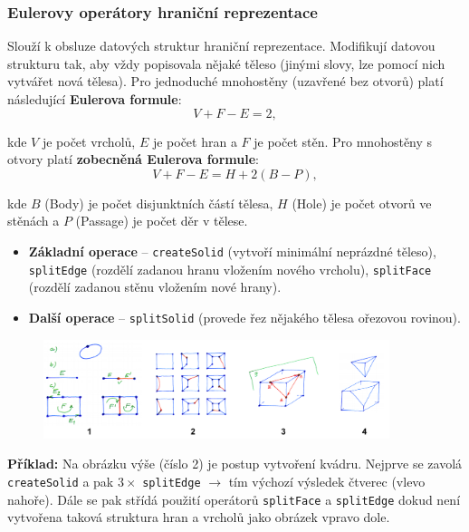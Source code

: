 \subsubsection{Eulerovy operátory hraniční reprezentace}
Slouží k obsluze datových struktur hraniční reprezentace. Modifikují datovou strukturu tak, aby vždy popisovala nějaké těleso (jinými slovy, lze pomocí nich vytvářet nová tělesa). Pro jednoduché mnohostěny (uzavřené bez otvorů) platí následující \textbf{Eulerova formule}:
\begin{equation*}
V + F - E = 2,
\end{equation*}

kde $ V $ je počet vrcholů, $ E $ je počet hran a $ F $ je počet stěn. Pro mnohostěny s otvory platí \textbf{zobecněná Eulerova formule}:
\begin{equation*}
V + F - E = H + 2(B - P),
\end{equation*}

kde $ B $ (Body) je počet disjunktních částí tělesa, $ H $ (Hole) je počet otvorů ve stěnách a $ P $ (Passage) je počet děr v tělese.

\begin{itemize}
	\item \textbf{Základní operace} -- \texttt{createSolid} (vytvoří minimální neprázdné těleso), \texttt{splitEdge} (rozdělí zadanou hranu vložením nového vrcholu), \texttt{splitFace} (rozdělí zadanou stěnu vložením nové hrany).
	\item \textbf{Další operace} -- \texttt{splitSolid} (provede řez nějakého tělesa ořezovou rovinou).
\end{itemize}

\begin{figure}[H]
	\centering
	\includegraphics[width=0.9\textwidth]{assets/4_hranicni_euler}
\end{figure} 

\textbf{Příklad:} Na obrázku výše (číslo 2) je postup vytvoření kvádru. Nejprve se zavolá \texttt{createSolid} a pak $3 \times$ \texttt{splitEdge} $\rightarrow$ tím výchozí výsledek čtverec (vlevo nahoře). Dále se pak střídá použití operátorů \texttt{splitFace} a \texttt{splitEdge} dokud není vytvořena taková struktura hran a vrcholů jako obrázek vpravo dole.

